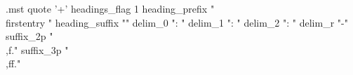 \begin{filecontents*}{\jobname.mst}
	quote '+'
	headings_flag 1
	heading_prefix "\\firstentry "
	heading_suffix ""
	delim_0 ": "
	delim_1 ": "
	delim_2 ": "
	delim_r "-"
	suffix_2p "\\,f."
	suffix_3p "\\,ff."
\end{filecontents*}

\documentclass[11pt,a4paper]{article}
\usepackage[utf8]{inputenc}
\usepackage[italian]{babel}
\usepackage{amsmath}
\usepackage{amsfonts}
\usepackage{amssymb}
\usepackage{array}
\usepackage{graphicx}
\usepackage{multirow}
\usepackage{color,colortbl}
\usepackage[hidelinks]{hyperref}
\usepackage{fancyhdr}
\usepackage{tabularx}
\usepackage{csquotes}
\usepackage[left=2cm,right=2cm,top=2cm,bottom=3cm]{geometry}
\usepackage{longtable}
\usepackage{lastpage}
\usepackage{hyperref}
\hypersetup{colorlinks,urlcolor=blue,linkcolor=black}
\usepackage[nottoc]{tocbibind}
\usepackage{makeidx}
\usepackage[indentunit=0.75em]{idxlayout}
\usepackage{ltablex}
\usepackage{ titlesec}

\makeindex
\def\firstentry#1\item#2{\item\textbf{#2}}

\pagestyle{fancy}
\fancyhf{}



